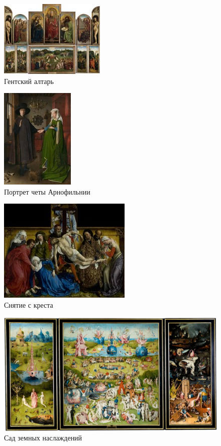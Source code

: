
\begin{figure}[ht]
    \centering
    \includegraphics{img/northern/1.jpg}
    \caption{Гентский алтарь}
    \label{fig:north:1}
\end{figure}

\begin{figure}[ht]
    \centering
    \includegraphics{img/northern/2.jpg}
    \caption{Портрет четы Арнофильнии}
    \label{fig:north:2}
\end{figure}

\begin{figure}[ht]
    \centering
    \includegraphics{img/northern/3.jpg}
    \caption{Снятие с креста}
    \label{fig:north:3}
\end{figure}

\begin{figure}[ht]
    \centering
    \includegraphics{img/northern/4.jpg}
    \caption{Сад земных наслаждений}
    \label{fig:north:4}
\end{figure}

